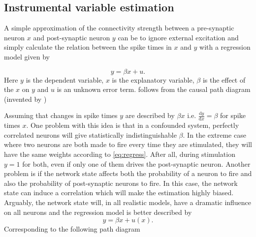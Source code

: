 \documentclass[11pt]{article}
\newcommand{\de}[2]{\frac{\mathrm{d} #1}{\mathrm{d} #2}}
\begin{document}
\subsection{Instrumental variable estimation}
A simple approximation of the connectivity strength between a pre-synaptic neuron $ x $ and post-synaptic neuron $ y $ can be to ignore external excitation and simply calculate the relation between the spike times in $ x $ and $ y $ with a regression model given by

\begin{equation}
y = \beta x + u.
\label{eq:regress}
\end{equation}
Here $ y $ is the dependent variable, $ x $ is the explanatory variable, $ \beta $ is the effect of the $ x$ on $y $ and $ u $ is an unknown error term.  follows from the causal path diagram (invented by \cite{wright1921correlation})
\begin{center}
\end{center}
Assuming that changes in spike times $ y $ are described by $ \beta x $ i.e. $ \de{y}{x} = \beta $ for spike times $ x $. One problem with this idea is that in a confounded system, perfectly correlated neurons will give statistically indistinguishable $ \beta $. In the extreme case where two neurons are both made to fire every time they are stimulated, they will have the same weights according to \cref{eq:regress}. After all, during stimulation $ y=1 $ for both, even if only one of them drives the post-synaptic neuron. Another problem is if the network state affects both the probability of a neuron to fire and also the probability of post-synaptic neurons to fire. In this case, the network state can induce a correlation which will make the estimation highly biased. Arguably, the network state will, in all realistic models, have a dramatic influence on all neurons and the regression model is better described by
\begin{equation}
y = \beta x + u(x).
\end{equation}
Corresponding to the following path diagram
\end{document}
